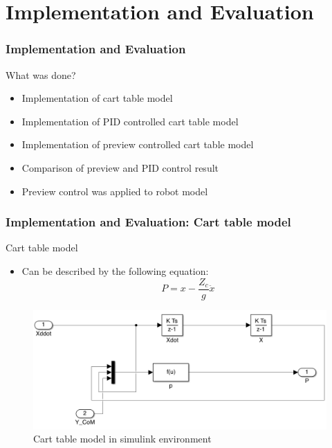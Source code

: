\documentclass{beamer}
\begin{document}
	\section*{Implementation and Evaluation}
	\begin{frame}
		\frametitle{Implementation and Evaluation}
		\begin{block}{What was done?}
			\begin{itemize}
				\item
					Implementation of cart table model
				\item
					Implementation of PID controlled cart table model
				\item
					Implementation of preview controlled cart table model
				\item
					Comparison of preview and PID control result
				\item
					Preview control was applied to robot model
			\end{itemize}
		\end{block}
	\end{frame}


\begin{frame}
	\frametitle{Implementation and Evaluation: Cart table model}
	\begin{block}{Cart table model}
		\begin{itemize}
			\item
				Can be described by the following equation:
				\begin{equation}
						P = x - \dfrac{Z_c}{g} \ddot{x}
				\end{equation}
		\end{itemize}
	\end{block}
	
	\begin{figure}[h!]
		\centering
		\includegraphics[width=0.8\linewidth]{presentation_images/18}
		\caption{Cart table model in simulink environment}
	\end{figure}
\end{frame}
\end{document}
